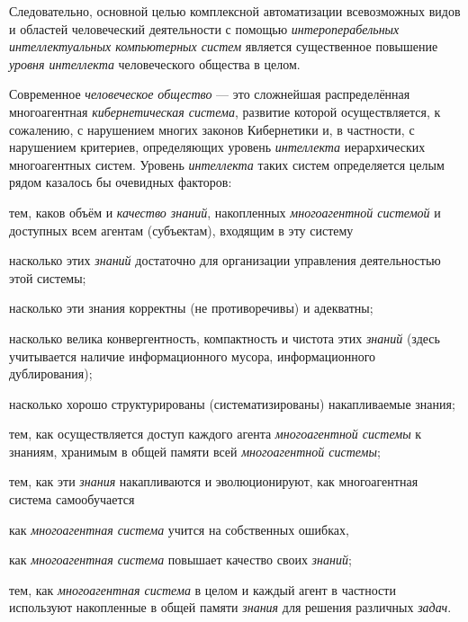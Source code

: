 Следовательно, основной целью комплексной автоматизации всевозможных видов и областей человеческий деятельности с помощью \textit{интероперабельных интеллектуальных компьютерных систем} является существенное повышение \textit{уровня интеллекта}  человеческого общества в целом.

Современное \textit{человеческое общество} --- это сложнейшая распределённая многоагентная \textit{кибернетическая система}, развитие которой осуществляется, к сожалению, с нарушением многих законов Кибернетики и, в частности, с нарушением критериев, определяющих уровень \textit{интеллекта} иерархических многоагентных систем. Уровень \textit{интеллекта} таких систем определяется целым рядом казалось бы очевидных факторов:
\begin{textitemize}
	\item тем, каков объём и \textit{качество знаний}, накопленных \textit{многоагентной системой} и доступных всем агентам (субъектам), входящим в эту систему
	\begin{textitemize}
		\item насколько этих \textit{знаний} достаточно для организации управления деятельностью этой системы;
		\item насколько эти знания корректны (не противоречивы) и адекватны;
		\item насколько велика конвергентность, компактность и чистота этих \textit{знаний} (здесь учитывается наличие информационного мусора, информационного дублирования);
		\item насколько хорошо структурированы (систематизированы) накапливаемые знания;
	\end{textitemize}
	\item тем, как осуществляется доступ каждого агента \textit{многоагентной системы} к знаниям, хранимым в общей памяти всей \textit{многоагентной системы};
	\medskip
	\item тем, как эти \textit{знания} накапливаются и эволюционируют, как многоагентная система самообучается
	\begin{textitemize}
		\item как \textit{многоагентная система} учится на собственных ошибках,
		\item как \textit{многоагентная система} повышает качество своих \textit{знаний};
	\end{textitemize}
	\item тем, как \textit{многоагентная система} в целом и каждый агент в частности используют накопленные в общей памяти \textit{знания} для решения различных \textit{задач}.
\end{textitemize}

